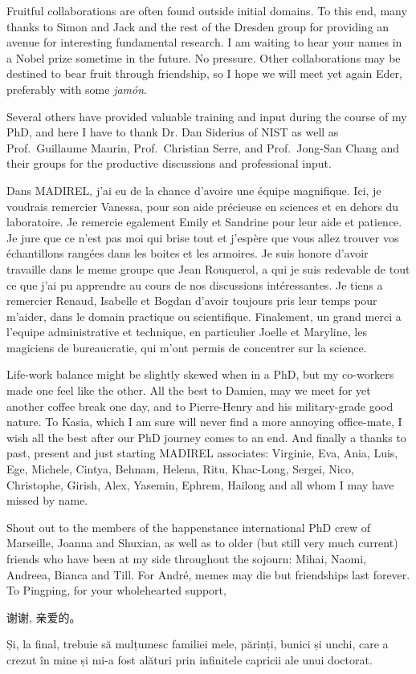 Fruitful collaborations are often found outside initial domains. 
To this end, many thanks to Simon and Jack and the rest of the Dresden 
group for providing an avenue for interesting fundamental research.
I am waiting to hear your names in a Nobel prize sometime in the
future. No pressure. Other collaborations may be destined to bear fruit
through friendship, so I hope we will meet yet again Eder, preferably 
with some \textit{jamón}.

Several others have provided valuable training and input during the 
course of my PhD, and here I have to thank Dr. Dan Siderius of NIST
as well as Prof.\ Guillaume Maurin, Prof.\ Christian Serre, and 
Prof.\ Jong-San Chang and their groups
for the productive discussions and professional input.

Dans MADIREL, j'ai eu de la chance d'avoire une équipe magnifique.
Ici, je voudrais remercier Vanessa, pour son aide précieuse en sciences
et en dehors du laboratoire.
Je remercie egalement Emily et Sandrine pour leur aide et patience.
Je jure que ce n'est pas moi qui brise tout et j'espère que vous allez
trouver vos échantillons  rangées dans les boites 
et les armoires. Je suis honore d'avoir travaille dans le meme groupe 
que Jean Rouquerol, a qui je suis redevable de tout ce que j'ai pu apprendre
au cours de nos discussions intéressantes. Je tiens a remercier 
Renaud, Isabelle et Bogdan d'avoir toujours pris leur temps pour m'aider,
dans le domain practique ou scientifique. 
Finalement, un grand merci a l'equipe administrative et technique,
en particulier Joelle et Maryline, les magiciens de bureaucratie, qui 
m'ont permis de concentrer sur la science.

Life-work balance might be slightly skewed when in a PhD, but my
co-workers made one feel like the other.
All the best to Damien, may we meet for yet another coffee break 
one day, and to Pierre-Henry and his military-grade good nature.
To Kasia, which I am sure will never find a more annoying
office-mate, I wish all the best after our PhD journey comes to 
an end.
And finally a thanks to past, present and just starting MADIREL
associates: Virginie, Eva, Ania, Luis, Ege, Michele, Cintya, Behnam, Helena,
Ritu, Khac-Long, Sergei, Nico, Christophe, Girish, Alex, Yasemin, Ephrem, Hailong
and all whom I may have missed by name.

Shout out to the members of the happenstance international PhD crew of Marseille,
Joanna and Shuxian, as well as to older (but still very much current) friends
who have been at my side throughout the sojourn: Mihai, Naomi, Andreea, Bianca
and Till. For André, memes may die but friendships last forever.
To Pingping, for your wholehearted support,
\begin{CJK*}{UTF8}{gbsn}
    谢谢, 亲爱的。
\end{CJK*}

Și, la final, trebuie să mulțumesc familiei mele, părinți, bunici și 
unchi, care a crezut în mine și mi-a fost alături prin infinitele 
capricii ale unui doctorat.